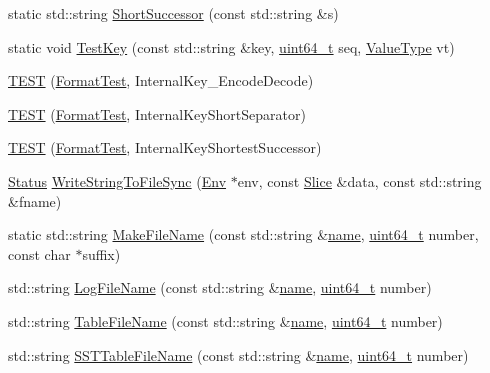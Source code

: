 \begin{DoxyCompactItemize}
static std\-::string \hyperlink{namespaceleveldb_a94e8c955ceebf1e1ff0cf1584cf747e3}{Short\-Successor} (const std\-::string \&s)
\item 
static void \hyperlink{namespaceleveldb_a3851e7150ed244dc0e1b85170326bd67}{Test\-Key} (const std\-::string \&key, \hyperlink{stdint_8h_aaa5d1cd013383c889537491c3cfd9aad}{uint64\-\_\-t} seq, \hyperlink{namespaceleveldb_acc038cb0d608414730cafa459a4ba866}{Value\-Type} vt)
\item 
\hyperlink{namespaceleveldb_a0cb5db14747e016f18aa8684a485bc00}{T\-E\-S\-T} (\hyperlink{classleveldb_1_1_format_test}{Format\-Test}, Internal\-Key\-\_\-\-Encode\-Decode)
\item 
\hyperlink{namespaceleveldb_a88307bc8d4ac8ed2a4d1a530b24e255f}{T\-E\-S\-T} (\hyperlink{classleveldb_1_1_format_test}{Format\-Test}, Internal\-Key\-Short\-Separator)
\item 
\hyperlink{namespaceleveldb_abfb19a8fcd10a881d34dba3821434415}{T\-E\-S\-T} (\hyperlink{classleveldb_1_1_format_test}{Format\-Test}, Internal\-Key\-Shortest\-Successor)
\item 
\hyperlink{classleveldb_1_1_status}{Status} \hyperlink{namespaceleveldb_aaa2ccf468819a9d769dd0bf38674a6e9}{Write\-String\-To\-File\-Sync} (\hyperlink{classleveldb_1_1_env}{Env} $\ast$env, const \hyperlink{classleveldb_1_1_slice}{Slice} \&data, const std\-::string \&fname)
\item 
static std\-::string \hyperlink{namespaceleveldb_a96df2d1ac438f65a90ba02abdb8eed3b}{Make\-File\-Name} (const std\-::string \&\hyperlink{testharness_8cc_a8f8f80d37794cde9472343e4487ba3eb}{name}, \hyperlink{stdint_8h_aaa5d1cd013383c889537491c3cfd9aad}{uint64\-\_\-t} number, const char $\ast$suffix)
\item 
std\-::string \hyperlink{namespaceleveldb_ae5aadcd574cc5186e7821177d44f4c6c}{Log\-File\-Name} (const std\-::string \&\hyperlink{testharness_8cc_a8f8f80d37794cde9472343e4487ba3eb}{name}, \hyperlink{stdint_8h_aaa5d1cd013383c889537491c3cfd9aad}{uint64\-\_\-t} number)
\item 
std\-::string \hyperlink{namespaceleveldb_ac9107e52d0ead114d749dc4b06dfd3ec}{Table\-File\-Name} (const std\-::string \&\hyperlink{testharness_8cc_a8f8f80d37794cde9472343e4487ba3eb}{name}, \hyperlink{stdint_8h_aaa5d1cd013383c889537491c3cfd9aad}{uint64\-\_\-t} number)
\item 
std\-::string \hyperlink{namespaceleveldb_aa3f12c506ffc9bf556b6cc2185313c1a}{S\-S\-T\-Table\-File\-Name} (const std\-::string \&\hyperlink{testharness_8cc_a8f8f80d37794cde9472343e4487ba3eb}{name}, \hyperlink{stdint_8h_aaa5d1cd013383c889537491c3cfd9aad}{uint64\-\_\-t} number)

\end{DoxyCompactItemize}
